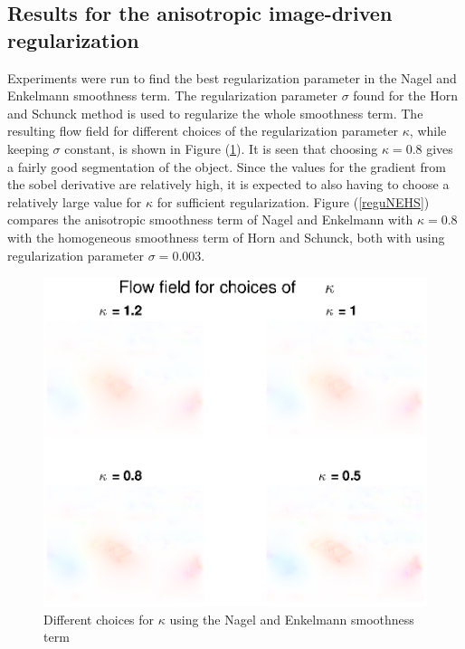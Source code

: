 \documentclass[10pt,a4paper]{article}
\begin{document}
\subsection{Results for the anisotropic image-driven regularization}
Experiments were run to find the best regularization parameter in the Nagel and Enkelmann smoothness term. The regularization parameter $\sigma$ found for the Horn and Schunck method is used to regularize the whole smoothness term. The resulting flow field for different choices of the regularization parameter $\kappa$, while keeping $\sigma$ constant, is shown in Figure (\ref{reguNE}). It is seen that choosing $\kappa = 0.8$ gives a fairly good segmentation of the object. Since the values for the gradient from the sobel derivative are relatively high, it is expected to also having to choose a relatively large value for $\kappa$ for sufficient regularization. Figure (\ref{reguNEHS}) compares the anisotropic smoothness term of Nagel and Enkelmann with $\kappa = 0.8$ with the homogeneous smoothness term of Horn and Schunck, both with using regularization parameter $\sigma = 0.003$. 

\begin{figure}
    \centering
    \includegraphics[scale=0.8]{regularizationNE.eps}
    \caption{Different choices for $\kappa$ using the Nagel and Enkelmann smoothness term}
    \label{reguNE}
\end{figure}
\end{document}
